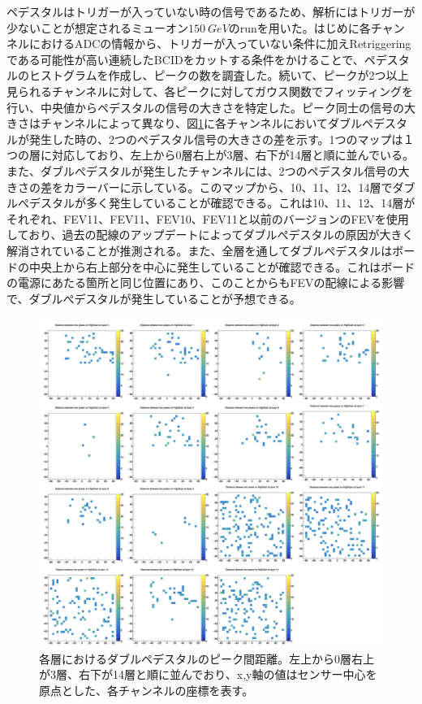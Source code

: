 ペデスタルはトリガーが入っていない時の信号であるため、解析にはトリガーが少ないことが想定されるミューオン$\SI{150}{GeV}$のrunを用いた。はじめに各チャンネルにおけるADCの情報から、トリガーが入っていない条件に加えRetriggeringである可能性が高い連続したBCIDをカットする条件をかけることで、ペデスタルのヒストグラムを作成し、ピークの数を調査した。続いて、ピークが2つ以上見られるチャンネルに対して、各ピークに対してガウス関数でフィッティングを行い、中央値からペデスタルの信号の大きさを特定した。ピーク同士の信号の大きさはチャンネルによって異なり、図\ref{dpmap}に各チャンネルにおいてダブルペデスタルが発生した時の、2つのペデスタル信号の大きさの差を示す。1つのマップは１つの層に対応しており、左上から0層右上が3層、右下が14層と順に並んでいる。また、ダブルぺデスタルが発生したチャンネルには、2つのペデスタル信号の大きさの差をカラーバーに示している。このマップから、10、11、12、14層でダブルぺデスタルが多く発生していることが確認できる。これは10、11、12、14層がそれぞれ、FEV11、FEV11、FEV10、FEV11と以前のバージョンのFEVを使用しており、過去の配線のアップデートによってダブルぺデスタルの原因が大きく解消されていることが推測される。また、全層を通してダブルぺデスタルはボードの中央上から右上部分を中心に発生していることが確認できる。これはボードの電源にあたる箇所と同じ位置にあり、このことからもFEVの配線による影響で、ダブルぺデスタルが発生していることが予想できる。

\begin{figure}[H]
\begin{center}
 \includegraphics[keepaspectratio, scale=0.45]
 	{Figure/Beamtest/dpmap.png}
 		\caption{各層におけるダブルペデスタルのピーク間距離。左上から0層右上が3層、右下が14層と順に並んでおり、x,y軸の値はセンサー中心を原点とした、各チャンネルの座標を表す。}
		\label{dpmap}
\end{center}
\end{figure}
